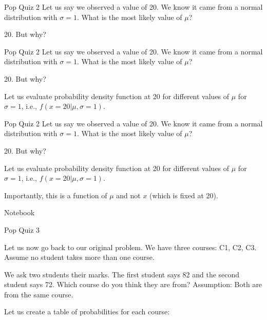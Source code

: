\documentclass[handout]{beamer}
\begin{document}
\begin{frame}{Pop Quiz 2}
    Let us say we observed a value of 20. We know it came from a normal distribution with $\sigma=1$. What is the most likely value of $\mu$?
    
    20. But why?


\end{frame}

\begin{frame}{Pop Quiz 2}
    Let us say we observed a value of 20. We know it came from a normal distribution with $\sigma=1$. What is the most likely value of $\mu$?
    
    20. But why?

    Let us evaluate probability density function at 20 for different values of $\mu$ for $\sigma=1$, i.e., $f(x=20|\mu, \sigma=1)$.


\end{frame}

\begin{frame}{Pop Quiz 2}
    Let us say we observed a value of 20. We know it came from a normal distribution with $\sigma=1$. What is the most likely value of $\mu$?
    
    20. But why?

    Let us evaluate probability density function at 20 for different values of $\mu$ for $\sigma=1$, i.e., $f(x=20|\mu, \sigma=1)$.

    Importantly, this is a function of $\mu$ and not $x$ (which is fixed at 20).

\end{frame}

\begin{frame}
    Notebook
\end{frame}

\begin{frame}{Pop Quiz 3}


Let us now go back to our original problem. We have three courses: C1, C2, C3. Assume no student takes more than one course.

We ask two students their marks. The first student says 82 and the second student says 72. Which course do you think they are from? Assumption: Both are from the same course.

Let us create a table of probabilities for each course:




    
\end{frame}
\end{document}
